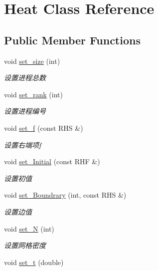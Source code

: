 \hypertarget{classHeat}{}\section{Heat Class Reference}
\label{classHeat}
\subsection*{Public Member Functions}
\begin{DoxyCompactItemize}
\item 
void \hyperlink{classHeat_abea1c1c77c8fd8654c9cdef12a238eeb}{set\+\_\+size} (int)
\begin{DoxyCompactList}\small\item\em 设置进程总数 \end{DoxyCompactList}\item 
void \hyperlink{classHeat_a95a5f94ca3965c0ba13ea1258eea31e4}{set\+\_\+rank} (int)
\begin{DoxyCompactList}\small\item\em 设置进程编号 \end{DoxyCompactList}\item 
void \hyperlink{classHeat_a3b7d978b4d27645c6f6bacd55c8cdbc2}{set\+\_\+f} (const R\+HS \&)
\begin{DoxyCompactList}\small\item\em 设置右端项f \end{DoxyCompactList}\item 
void \hyperlink{classHeat_a7dbbbb774cb0317d18a31342ce8e6865}{set\+\_\+\+Initial} (const R\+HF \&)
\begin{DoxyCompactList}\small\item\em 设置初值 \end{DoxyCompactList}\item 
void \hyperlink{classHeat_a5277a27b4f971ed54e66d8fe8ffe97f7}{set\+\_\+\+Boundrary} (int, const R\+HS \&)
\begin{DoxyCompactList}\small\item\em 设置边值 \end{DoxyCompactList}\item 
void \hyperlink{classHeat_af7b0ad84d2b149a944bada144c3e450f}{set\+\_\+N} (int)
\begin{DoxyCompactList}\small\item\em 设置网格密度 \end{DoxyCompactList}\item 
void \hyperlink{classHeat_a890e689eed8ad3992ff8b50dae40cace}{set\+\_\+t} (double)

\end{DoxyCompactItemize}

